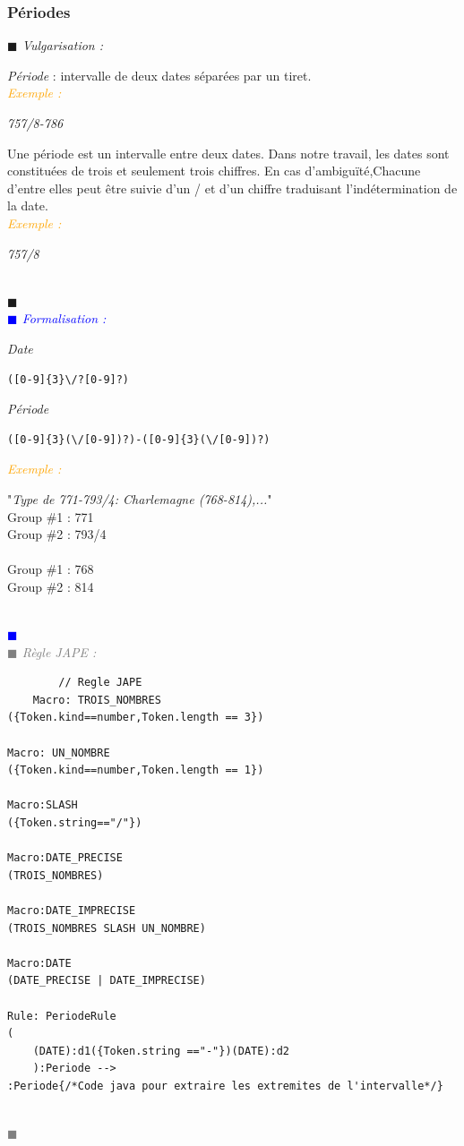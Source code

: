 \documentclass[a4paper, 11pt]{report}
\newenvironment{vulgarisation}
    {
    \textit{\textcolor{dark-blue}{$\blacksquare$  Vulgarisation : \\}}

    }
    {
    ~\\\textcolor{dark-blue}{$\blacksquare$}\\
    }
\newenvironment{formalisation}
    {
    \textit{\textcolor{blue}{$\blacksquare$  Formalisation : \\}}
    }
    {
    ~\\\textcolor{blue}{$\blacksquare$}\\
    }
\newenvironment{codage}
    {
    \textit{\textcolor{gray}{$\blacksquare$  Règle JAPE : \\}}
    }
    {
    ~\\\textcolor{gray}{$\blacksquare$}\\
    }
\newenvironment{exemple}
    {
    \textit{\textcolor{orange}{
    Exemple : \\}}
    }
    {~\\
    }
\begin{document}
	\subsubsection{Périodes}
\begin{vulgarisation}
	\textit{Période} : intervalle de deux dates séparées par un tiret.\\
	\begin{exemple}
		\textit{757/8-786}
	\end{exemple}
	
	Une période est un intervalle entre deux dates. Dans notre travail, les dates sont constituées de trois et seulement trois chiffres. En cas d'ambiguïté,Chacune d'entre elles peut être suivie d'un \og/\fg{} et d'un chiffre traduisant l'indétermination de la date.\\
	\begin{exemple}
		\textit{757/8}
	\end{exemple}
	
\end{vulgarisation}
\begin{formalisation}
	\textit{Date}
	\begin{verbatim}
([0-9]{3}\/?[0-9]?)
	\end{verbatim}
	\textit{Période}
	\begin{verbatim}
([0-9]{3}(\/[0-9])?)-([0-9]{3}(\/[0-9])?)
	\end{verbatim}
	\begin{exemple}
		"\emph{Type de 771-793/4: Charlemagne (768-814),...}" \\
		Group \#1 : 771 \\
		Group \#2 : 793/4\\\\\noindent
		Group \#1 : 768 \\
		Group \#2 : 814
	\end{exemple}
\end{formalisation}
	\begin{codage}
	\begin{lstlisting}
		// Regle JAPE
	Macro: TROIS_NOMBRES
({Token.kind==number,Token.length == 3})

Macro: UN_NOMBRE
({Token.kind==number,Token.length == 1})

Macro:SLASH
({Token.string=="/"})

Macro:DATE_PRECISE
(TROIS_NOMBRES)

Macro:DATE_IMPRECISE
(TROIS_NOMBRES SLASH UN_NOMBRE)

Macro:DATE
(DATE_PRECISE | DATE_IMPRECISE)

Rule: PeriodeRule
(
	(DATE):d1({Token.string =="-"})(DATE):d2
    ):Periode -->
:Periode{/*Code java pour extraire les extremites de l'intervalle*/}
	\end{lstlisting}
	\end{codage}
	
\end{document}
